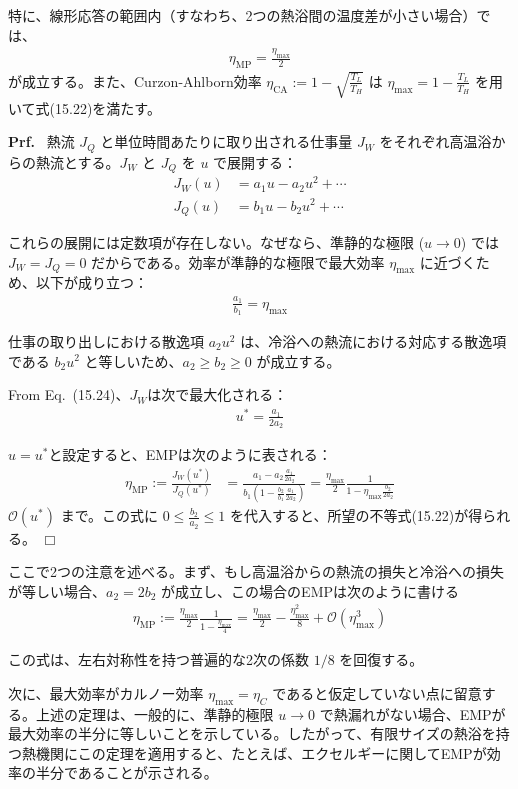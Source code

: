 \documentclass[a4paper,11pt]{jsarticle}
\numberwithin{equation}{section}
\begin{document}
特に、線形応答の範囲内（すなわち、2つの熱浴間の温度差が小さい場合）では、
\begin{align}
    \eta_{\text{MP}} = \frac{\eta_{\text{max}}}{2}
\end{align}
が成立する。また、Curzon-Ahlborn効率 $\eta_{\text{CA}} := 1 - \sqrt{\frac{T_L}{T_H}}$ は $\eta_{\text{max}} = 1 - \frac{T_L}{T_H}$ を用いて式(15.22)を満たす。

\textbf{Prf.} \ 熱流 $J_Q$ と単位時間あたりに取り出される仕事量 $J_W$ をそれぞれ高温浴からの熱流とする。$J_W$ と $J_Q$ を $u$ で展開する：
\begin{align}
    J_W(u) &= a_1 u - a_2 u^2 + \cdots \\
    J_Q(u) &= b_1 u - b_2 u^2 + \cdots
\end{align}

これらの展開には定数項が存在しない。なぜなら、準静的な極限 ($u \to 0$) では $J_W = J_Q = 0$ だからである。効率が準静的な極限で最大効率 $\eta_{\text{max}}$ に近づくため、以下が成り立つ：
\begin{align}
    \frac{a_1}{b_1} = \eta_{\text{max}}
\end{align}

仕事の取り出しにおける散逸項 $a_2 u^2$ は、冷浴への熱流における対応する散逸項である $b_2 u^2$ と等しいため、$a_2 \geq b_2 \geq 0$ が成立する。

From Eq.~(15.24)、$J_W$は次で最大化される：
\begin{align}
    u^* = \frac{a_1}{2 a_2}
\end{align}

$u = u^*$と設定すると、EMPは次のように表される：
\begin{align}
    \eta_{\text{MP}} := \frac{J_W(u^*)}{J_Q(u^*)} &= \frac{a_1 - a_2 \frac{a_1}{2a_2}}{b_1 \left( 1 - \frac{b_2}{b_1} \frac{a_1}{2a_2} \right)} = \frac{\eta_{\text{max}}}{2} \frac{1}{1 - \eta_{\text{max}} \frac{b_2}{2a_2}}
\end{align}
$\mathcal{O}(u^*)$ まで。この式に $0 \leq \frac{b_2}{a_2} \leq 1$ を代入すると、所望の不等式(15.22)が得られる。 \hfill $\Box$

ここで2つの注意を述べる。まず、もし高温浴からの熱流の損失と冷浴への損失が等しい場合、$a_2 = 2 b_2$ が成立し、この場合のEMPは次のように書ける
\begin{align}
    \eta_{\text{MP}} := \frac{\eta_{\text{max}}}{2} \frac{1}{1 - \frac{\eta_{\text{max}}}{4}} = \frac{\eta_{\text{max}}}{2} - \frac{\eta_{\text{max}}^2}{8} + \mathcal{O}(\eta_{\text{max}}^3)
\end{align}

この式は、左右対称性を持つ普遍的な2次の係数 $1/8$ を回復する。

次に、最大効率がカルノー効率 $\eta_{\text{max}} = \eta_C$ であると仮定していない点に留意する。上述の定理は、一般的に、準静的極限 $u \to 0$ で熱漏れがない場合、EMPが最大効率の半分に等しいことを示している。したがって、有限サイズの熱浴を持つ熱機関にこの定理を適用すると、たとえば、エクセルギーに関してEMPが効率の半分であることが示される。
\end{document}
